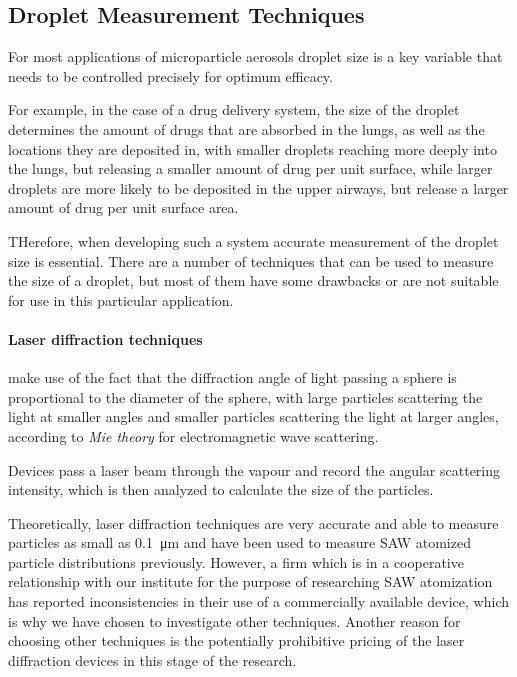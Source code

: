 \subsection{Droplet Measurement Techniques}
\label{sec:measurement_techniques}

For most applications of microparticle aerosols droplet size is a key variable that needs to be controlled precisely for optimum efficacy.

For example, in the case of a drug delivery system, the size of the droplet determines the amount of drugs that are absorbed in the lungs, as well as the locations they are deposited in, with smaller droplets reaching more deeply into the lungs, but releasing a smaller amount of drug per unit surface, while larger droplets are more likely to be deposited in the upper airways, but release a larger amount of drug per unit surface area. \cite{labirisPulmonaryDrugDelivery2003}

THerefore, when developing such a system accurate measurement of the droplet size is essential. There are a number of techniques that can be used to measure the size of a droplet, but most of them have some drawbacks or are not suitable for use in this particular application.

\paragraph{Laser diffraction techniques} make use of the fact that the diffraction angle of light passing a sphere is proportional to the diameter of the sphere, with large particles scattering the light at smaller angles and smaller particles scattering the light at larger angles, according to \emph{Mie theory} for electromagnetic wave scattering.

Devices pass a laser beam through the vapour and record the angular scattering intensity, which is then analyzed to calculate the size of the particles. 

Theoretically, laser diffraction techniques are very accurate and able to measure particles as small as \SI{0.1}{\micro\meter} and have been used to measure SAW atomized particle distributions previously. 
However, a firm which is in a cooperative relationship with our institute for the purpose of researching SAW atomization has reported inconsistencies in their use of a commercially available device, which is why we have chosen to investigate other techniques.
Another reason for choosing other techniques is the potentially prohibitive pricing of the laser diffraction devices in this stage of the research.


